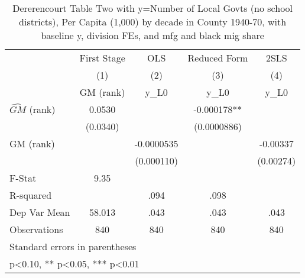 \begin{table}[htbp]\centering
\def\sym#1{\ifmmode^{#1}\else\(^{#1}\)\fi}
\caption{Dererencourt Table Two with y=Number of Local Govts (no school districts), Per Capita (1,000) by decade in County 1940-70, with baseline y, division FEs, and mfg and black mig share}
\begin{tabular}{l*{4}{c}}
\toprule
                    & First Stage   &         OLS   &Reduced Form   &        2SLS   \\
                    &\multicolumn{1}{c}{(1)}&\multicolumn{1}{c}{(2)}&\multicolumn{1}{c}{(3)}&\multicolumn{1}{c}{(4)}\\
                    &\multicolumn{1}{c}{GM  (rank)}&\multicolumn{1}{c}{y\_L0}&\multicolumn{1}{c}{y\_L0}&\multicolumn{1}{c}{y\_L0}\\
\midrule
$\hat{GM}$ (rank)   &      0.0530   &               &   -0.000178** &               \\
                    &    (0.0340)   &               & (0.0000886)   &               \\
\addlinespace
GM  (rank)          &               &  -0.0000535   &               &    -0.00337   \\
                    &               &  (0.000110)   &               &   (0.00274)   \\
\midrule
F-Stat              &        9.35   &               &               &               \\
R-squared           &               &        .094   &        .098   &               \\
Dep Var Mean        &      58.013   &        .043   &        .043   &        .043   \\
Observations        &         840   &         840   &         840   &         840   \\
\bottomrule
\multicolumn{5}{l}{\footnotesize Standard errors in parentheses}\\
\multicolumn{5}{l}{\footnotesize * p<0.10, ** p<0.05, *** p<0.01}\\
\end{tabular}
\end{table}
